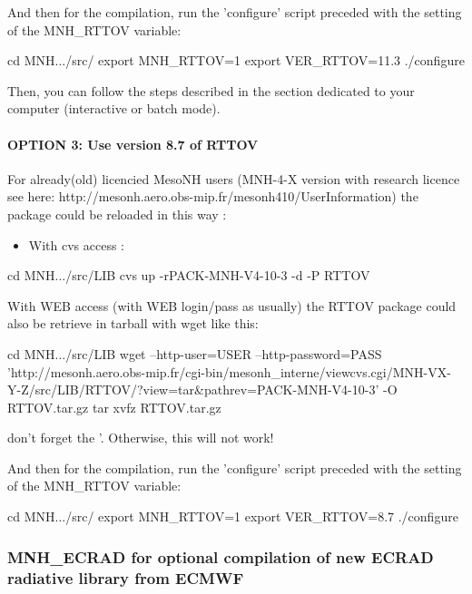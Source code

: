 And then for the compilation, run the 'configure' script preceded with the setting of the MNH\_RTTOV variable:
\begin{bashcode}
cd MNH.../src/
export MNH_RTTOV=1
export VER_RTTOV=11.3
./configure
\end{bashcode}

Then, you can follow the steps described in the section dedicated to your computer (interactive or batch mode).

\paragraph{OPTION 3: Use version 8.7 of RTTOV}

For already(old) licencied MesoNH users (MNH-4-X version with research licence see here: http://mesonh.aero.obs-mip.fr/mesonh410/UserInformation) the package could be reloaded in this way :
\begin{itemize}
\item With cvs access :
\end{itemize}
\begin{bashcode}
cd MNH.../src/LIB
cvs up -rPACK-MNH-V4-10-3 -d -P RTTOV
\end{bashcode}
\begin{itemize}
With WEB access (with WEB login/pass as usually) the RTTOV package could also be retrieve in tarball with wget like this:
\end{itemize}
\begin{bashcode}
cd MNH.../src/LIB
wget --http-user=USER  --http-password=PASS 'http://mesonh.aero.obs-mip.fr/cgi-bin/mesonh_interne/viewcvs.cgi/MNH-VX-Y-Z/src/LIB/RTTOV/?view=tar&pathrev=PACK-MNH-V4-10-3' -O RTTOV.tar.gz
tar xvfz RTTOV.tar.gz
\end{bashcode}

\begin{warningblock}
don't forget the '.  Otherwise, this will not work!
\end{warningblock}

And then for the compilation, run the 'configure' script preceded with the setting of the MNH\_RTTOV variable:
\begin{bashcode}
cd MNH.../src/
export MNH_RTTOV=1
export VER_RTTOV=8.7
./configure
\end{bashcode}

\subsubsection{MNH\_ECRAD for optional compilation of new ECRAD radiative library from ECMWF}

